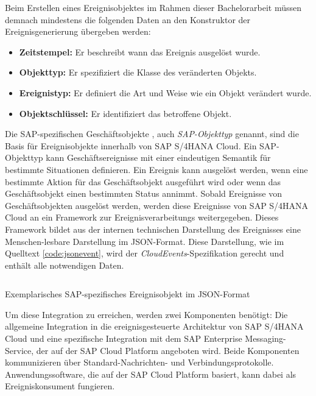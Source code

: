 Beim Erstellen eines Ereignisobjektes im Rahmen dieser Bachelorarbeit müssen demnach mindestens die folgenden Daten an den Konstruktor der Ereignisgenerierung übergeben werden:
\begin{itemize}
    \item \textbf{Zeitstempel:} Er beschreibt wann das Ereignis ausgelöst wurde. 
    \item \textbf{Objekttyp:} Er spezifiziert die Klasse des veränderten Objekts. 
    \item \textbf{Ereignistyp:} Er definiert die Art und Weise wie ein Objekt verändert wurde. 
    \item \textbf{Objektschlüssel:} Er identifiziert das betroffene Objekt. 
\end{itemize}

Die SAP-spezifischen Geschäftsobjekte , auch \textit{SAP-Objekttyp} genannt, sind die Basis für Ereignisobjekte innerhalb von SAP S/4HANA Cloud. 
Ein SAP-Objekttyp kann Geschäftsereignisse mit einer eindeutigen Semantik für bestimmte Situationen definieren.
Ein Ereignis kann ausgelöst werden, wenn eine bestimmte Aktion für das Geschäftsobjekt ausgeführt wird oder wenn das Geschäftsobjekt einen bestimmten Status annimmt.
Sobald Ereignisse von Geschäftsobjekten ausgelöst werden, werden diese Ereignisse von SAP S/4HANA Cloud an ein Framework zur Ereignisverarbeitungs weitergegeben. 
\cite{Herzig.2018}
Dieses Framework bildet aus der internen technischen Darstellung des Ereignisses eine Menschen-lesbare Darstellung im \ac{JSON}-Format. Diese Darstellung, wie im Quelltext \ref{code:jsonevent}, wird der \textit{CloudEvents}-Spezifikation gerecht und enthält alle notwendigen Daten.
\cite{Herzig.2018}

\begin{algorithm}[H]
\centering 
\inputminted[linenos]{js}{code/sapevent.json}
\caption{Exemplarisches SAP-spezifisches Ereignisobjekt im JSON-Format \cite{Herzig.2018}}
\label{code:jsonevent}
\end{algorithm}

Um diese Integration zu erreichen, werden zwei Komponenten benötigt: Die allgemeine Integration in die ereignisgesteuerte Architektur von SAP S/4HANA Cloud und eine spezifische Integration mit dem SAP Enterprise Messaging-Service, der auf der SAP Cloud Platform angeboten wird. Beide Komponenten kommunizieren über Standard-Nachrichten- und Verbindungsprotokolle. Anwendungssoftware, die auf der SAP Cloud Platform basiert, kann dabei als Ereigniskonsument fungieren.

